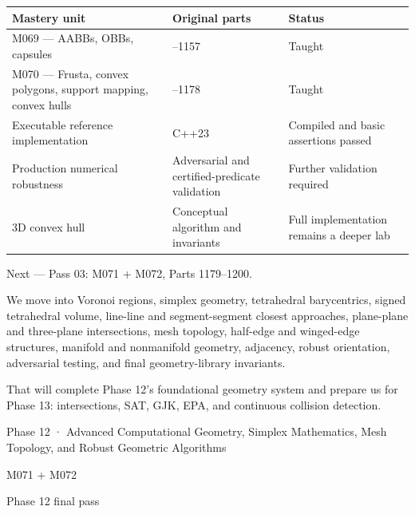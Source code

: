 {\def\LTcaptype{none} %
\begin{longtable}[]{@{}
  >{\raggedright\arraybackslash}p{}
  >{\raggedright\arraybackslash}p{}
  >{\raggedright\arraybackslash}p{}@{}}
\toprule\noalign{}
\begin{minipage}[b]{\linewidth}\raggedright
Mastery unit
\end{minipage} & \begin{minipage}[b]{\linewidth}\raggedright
Original parts
\end{minipage} & \begin{minipage}[b]{\linewidth}\raggedright
Status
\end{minipage} \\
\midrule\noalign{}
\endhead
\bottomrule\noalign{}
\endlastfoot
M069 --- AABBs, OBBs, capsules & 1133--1157 & Taught \\
M070 --- Frusta, convex polygons, support mapping, convex hulls & 1158--1178 & Taught \\
Executable reference implementation & C++23 & Compiled and basic assertions passed \\
Production numerical robustness & Adversarial and certified-predicate validation & Further validation required \\
3D convex hull & Conceptual algorithm and invariants & Full implementation remains a deeper lab \\
\end{longtable}
}

Next --- Pass 03: M071 + M072, Parts 1179--1200.

We move into Voronoi regions, simplex geometry, tetrahedral barycentrics, signed tetrahedral volume, line-line and segment-segment closest approaches, plane-plane and three-plane intersections, mesh topology, half-edge and winged-edge structures, manifold and nonmanifold geometry, adjacency, robust orientation, adversarial testing, and final geometry-library invariants.

That will complete Phase 12's foundational geometry system and prepare us for Phase 13: intersections, SAT, GJK, EPA, and continuous collision detection.

Phase 12 · Advanced Computational Geometry, Simplex Mathematics, Mesh Topology, and Robust Geometric Algorithms

M071 + M072

Phase 12 final pass

